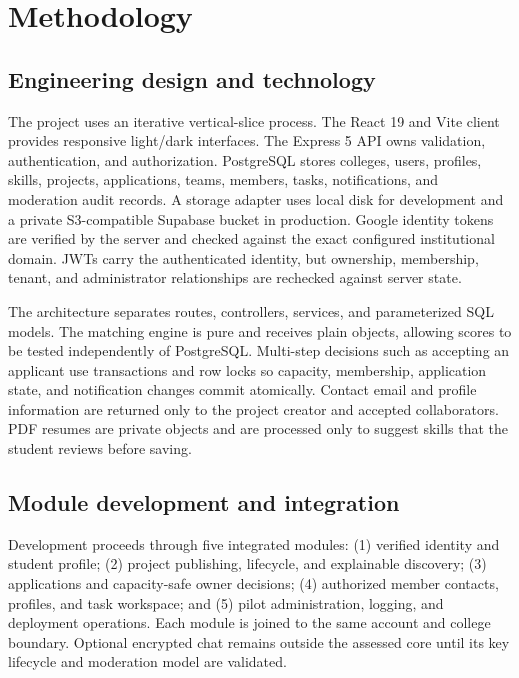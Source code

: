 \documentclass[11pt,a4paper]{article}
\begin{document}
\section{Methodology}

\subsection{Engineering design and technology}

The project uses an iterative vertical-slice process. The React 19 and Vite client provides responsive light/dark interfaces. The Express 5 API owns validation, authentication, and authorization. PostgreSQL stores colleges, users, profiles, skills, projects, applications, teams, members, tasks, notifications, and moderation audit records. A storage adapter uses local disk for development and a private S3-compatible Supabase bucket in production. Google identity tokens are verified by the server and checked against the exact configured institutional domain. JWTs carry the authenticated identity, but ownership, membership, tenant, and administrator relationships are rechecked against server state.

The architecture separates routes, controllers, services, and parameterized SQL models. The matching engine is pure and receives plain objects, allowing scores to be tested independently of PostgreSQL. Multi-step decisions such as accepting an applicant use transactions and row locks so capacity, membership, application state, and notification changes commit atomically. Contact email and profile information are returned only to the project creator and accepted collaborators. PDF resumes are private objects and are processed only to suggest skills that the student reviews before saving.

\subsection{Module development and integration}

Development proceeds through five integrated modules: (1) verified identity and student profile; (2) project publishing, lifecycle, and explainable discovery; (3) applications and capacity-safe owner decisions; (4) authorized member contacts, profiles, and task workspace; and (5) pilot administration, logging, and deployment operations. Each module is joined to the same account and college boundary. Optional encrypted chat remains outside the assessed core until its key lifecycle and moderation model are validated.
\end{document}
